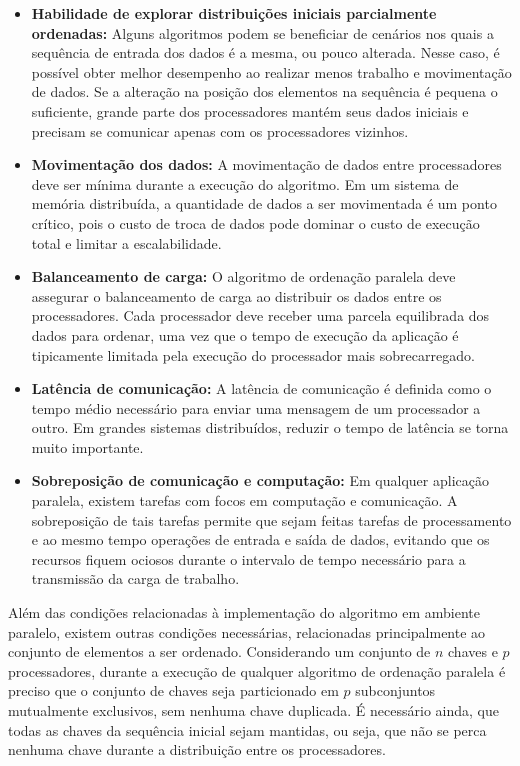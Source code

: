\begin{itemize}
\item \textbf{Habilidade de explorar distribuições iniciais parcialmente ordenadas:}
Alguns algoritmos podem se beneficiar de cenários nos quais a sequência de entrada dos dados é a mesma, ou pouco alterada. Nesse caso, é possível obter melhor desempenho ao realizar menos trabalho e movimentação de dados.
Se a alteração na posição dos elementos na sequência é pequena o suficiente, grande parte dos processadores mantém seus dados iniciais e precisam se comunicar apenas com os processadores vizinhos.

\item \textbf{Movimentação dos dados:}
A movimentação de dados entre processadores deve ser mínima durante a execução do algoritmo. Em um sistema de memória distribuída, a quantidade de dados a ser movimentada é um ponto crítico, pois o custo de troca de dados pode dominar o custo de execução total e limitar a escalabilidade.

\item \textbf{Balanceamento de carga:}
O algoritmo de ordenação paralela deve assegurar o balanceamento de carga ao distribuir os dados entre os processadores. Cada processador deve receber uma parcela equilibrada dos dados para ordenar, uma vez que o tempo de execução da aplicação é tipicamente limitada pela execução do processador mais sobrecarregado.

\item \textbf{Latência de comunicação:}
A latência de comunicação é definida como o tempo médio necessário para enviar uma mensagem de um processador a outro.
Em grandes sistemas distribuídos, reduzir o tempo de latência se torna muito importante.

\item \textbf{Sobreposição de comunicação e computação:}
Em qualquer aplicação paralela, existem tarefas com focos em computação e comunicação. A sobreposição de tais tarefas permite que sejam feitas tarefas de processamento e ao mesmo tempo operações de entrada e saída de dados, evitando que os recursos fiquem ociosos durante o intervalo de tempo necessário para a transmissão da carga de trabalho.

\end{itemize}


Além das condições relacionadas à implementação do algoritmo em ambiente paralelo, existem outras condições necessárias, relacionadas principalmente ao conjunto de elementos a ser ordenado. Considerando um conjunto de $n$ chaves e  $p$ processadores,  durante a execução de qualquer algoritmo de ordenação paralela é preciso que o conjunto de chaves seja particionado em $p$ subconjuntos mutualmente exclusivos, sem nenhuma chave duplicada. É necessário ainda, que todas as chaves da sequência inicial sejam mantidas, ou seja, que não se perca nenhuma chave durante a distribuição entre os processadores.

